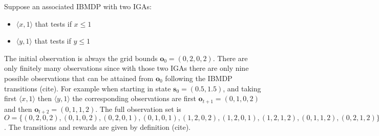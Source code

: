 Suppose an associated IBMDP with two IGAs:
\begin{itemize}
    \item $\langle x, 1\rangle$ that tests if $x\leq 1$
    \item $\langle y, 1\rangle$ that tests if $y\leq 1$
\end{itemize}
The initial observation is always the grid bounds $\boldsymbol{o}_0=(0, 2, 0, 2)$.
There are only finitely many observations since with those two IGAs there are only nine possible observations that can be attained from $\boldsymbol{o}_0$ following the IBMDP transitions (cite).
For example when starting in state $\boldsymbol{s}_0 = (0.5, 1.5)$, and taking first $\langle x, 1\rangle$ then $\langle y, 1\rangle$ the corresponding observations are first $\boldsymbol{o}_{t+1} = (0, 1, 0, 2)$ and then $\boldsymbol{o}_{t+2} = (0, 1, 1, 2)$.
The full observation set is $O = \{(0, 2, 0, 2), (0, 1, 0, 2), (0, 2, 0, 1), (0, 1, 0, 1), (1, 2, 0, 2), (1, 2, 0, 1), (1, 2, 1, 2), (0, 1, 1, 2), (0, 2, 1, 2)\}$.
The transitions and rewards are given by definition (cite).

